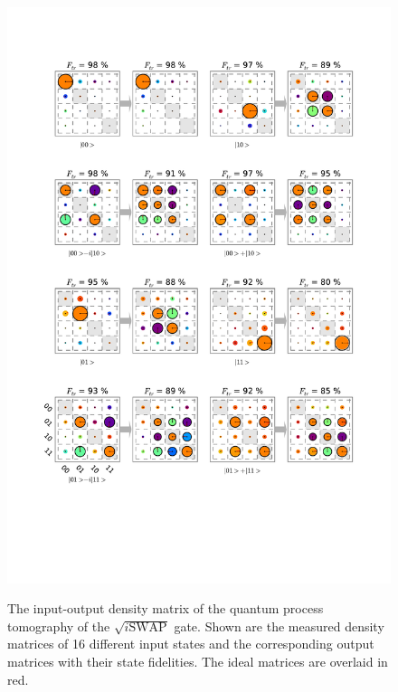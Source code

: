 \begin{figure}[p]
	\centering
		\includegraphics[width=1.0\textwidth]{"./data/ct5/2011_04_21 - grover and tomo/good_data/process -matrices 1"}
	\label{fig:ProcessInputOutputMatrices1}
	\caption{The input-output density matrix of the quantum process tomography of the $\sqrt{i\mathrm{SWAP}}$ gate. Shown are the measured density matrices of 16 different input states and the corresponding output matrices with their state fidelities. The ideal matrices are overlaid in red.}
\end{figure}

